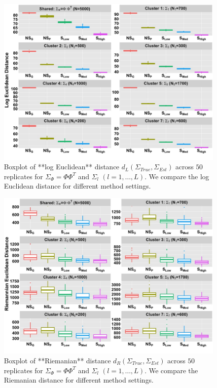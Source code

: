\documentclass[
]{book}
\begin{document}
\begin{figure}

{\centering \includegraphics[width=0.8\linewidth]{images/Log_Euclidean_plot} 

}

\caption{Boxplot of **log Euclidean** distance $d_{L}( \Sigma_{True}, \Sigma_{Est})$ across  $50$ replicates for $\Sigma_{\Phi} = \Phi \Phi^{T}$ and $\Sigma_{l}$ $(l = 1, \dots , L)$. We compare the log Euclidean distance for different method settings.}\label{fig:LogEuclid}
\end{figure}

\begin{figure}

{\centering \includegraphics[width=0.8\linewidth]{images/Rei_Euclidean_plot} 

}

\caption{Boxplot of **Riemanian** distance $d_{R}( \Sigma_{True}, \Sigma_{Est})$ across  $50$ replicates for $\Sigma_{\Phi} = \Phi \Phi^{T}$ and $\Sigma_{l}$ $(l = 1, \dots , L)$. We compare the Riemanian distance for different method settings.}\label{fig:ReiEuclid}
\end{figure}
\end{document}
